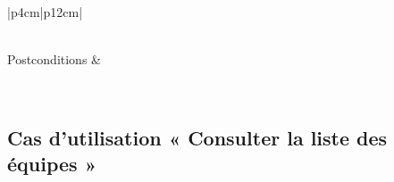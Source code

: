 \begin{longtable}{|p{4cm}|p{12cm}|}
\begin{minipage}[t]{\linewidth}
\begin{enumerate}[ nosep,after=\strut, ]
                                \end{enumerate}
                            \end{minipage}
                        \\
                        
                        \hline
                        Postconditions &   \\
                        \hline
                    \caption{Description du cas d'utilisation « Consulter le résumé de mon équipe »}\\
            \end{longtable}
            
    \subsection*{Cas d'utilisation « Consulter la liste des équipes »}
